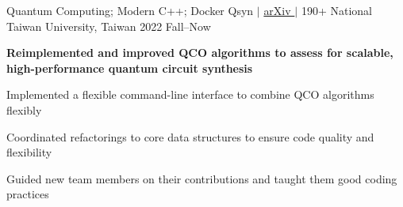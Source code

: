 

\begin{cventries}
    \cventry
        {Quantum Computing; Modern C++; Docker} %
        {Qsyn 
        $|$ 
        \href{https://arxiv.org/abs/2405.07197}{arXiv \faLink} 
        $|$ 
        \href{https://github.com/DVLab-NTU/qsyn}{\faGithub} 190+ \raisebox{0.1em}{\textbf{$\star$}}} %
        {National Taiwan University, Taiwan} %
        {2022 Fall--Now} %
        {
          \begin{cvitems} %
            \item \textcolor{awesome}{\textbf{Reimplemented and improved QCO algorithms to assess for scalable, high-performance quantum circuit synthesis}}
            \item Implemented a flexible command-line interface to combine QCO algorithms flexibly
            \item Coordinated refactorings to core data structures to ensure code quality and flexibility
            \item Guided new team members on their contributions and taught them good coding practices
          \end{cvitems}
        }



\end{cventries}
